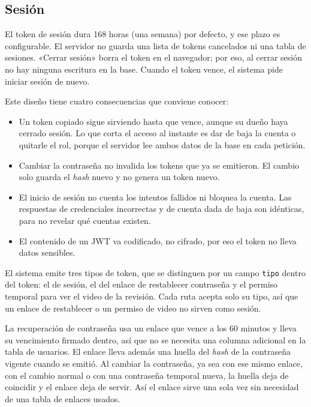 \subsection{Sesión}

El token de sesión dura 168 horas (una semana) por defecto, y ese plazo es configurable. El servidor no guarda una
lista de tokens cancelados ni una tabla de sesiones. «Cerrar sesión» borra el token en el navegador; por eso, al cerrar
sesión no hay ninguna escritura en la base. Cuando el token vence, el sistema pide iniciar sesión de nuevo.

Este diseño tiene cuatro consecuencias que conviene conocer:
\begin{itemize}
  \item Un token copiado sigue sirviendo hasta que vence, aunque su dueño haya cerrado sesión. Lo que corta el acceso
        al instante es dar de baja la cuenta o quitarle el rol, porque el servidor lee ambos datos de la base en cada
        petición.
  \item Cambiar la contraseña no invalida los tokens que ya se emitieron. El cambio solo guarda el \textit{hash}
        nuevo y no genera un token nuevo.
  \item El inicio de sesión no cuenta los intentos fallidos ni bloquea la cuenta. Las respuestas de credenciales
        incorrectas y de cuenta dada de baja son idénticas, para no revelar qué cuentas existen.
  \item El contenido de un JWT va codificado, no cifrado, por eso el token no lleva datos sensibles.
\end{itemize}

El sistema emite tres tipos de token, que se distinguen por un campo \texttt{tipo} dentro del token: el de sesión, el
del enlace de restablecer contraseña y el permiso temporal para ver el video de la revisión. Cada ruta acepta solo su
tipo, así que un enlace de restablecer o un permiso de video no sirven como sesión.

La recuperación de contraseña usa un enlace que vence a los 60 minutos y lleva su vencimiento firmado dentro, así que no
se necesita una columna adicional en la tabla de usuarios. El enlace lleva además una huella del \textit{hash} de la
contraseña vigente cuando se emitió. Al cambiar la contraseña, ya sea con ese mismo enlace, con el cambio normal o con
una contraseña temporal nueva, la huella deja de coincidir y el enlace deja de servir. Así el enlace sirve una sola vez
sin necesidad de una tabla de enlaces usados.

